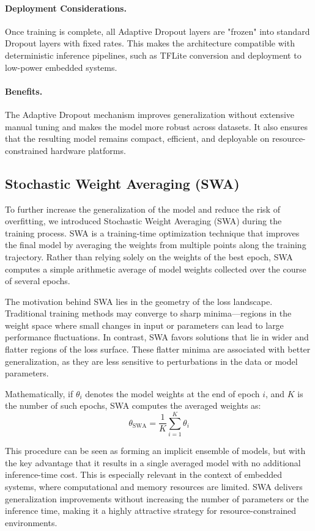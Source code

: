 \paragraph{Deployment Considerations.} Once training is complete, all Adaptive Dropout layers are "frozen" into standard Dropout layers with fixed rates. This makes the architecture compatible with deterministic inference pipelines, such as TFLite conversion and deployment to low-power embedded systems.

\paragraph{Benefits.} The Adaptive Dropout mechanism improves generalization without extensive manual tuning and makes the model more robust across datasets. It also ensures that the resulting model remains compact, efficient, and deployable on resource-constrained hardware platforms.

\subsection{Stochastic Weight Averaging (SWA)}
To further increase the generalization of the model and reduce the risk of overfitting, we introduced Stochastic Weight Averaging (SWA) during the training process. SWA is a training-time optimization technique that improves the final model by averaging the weights from multiple points along the training trajectory. Rather than relying solely on the weights of the best epoch, SWA computes a simple arithmetic average of model weights collected over the course of several epochs.

The motivation behind SWA lies in the geometry of the loss landscape. Traditional training methods may converge to sharp minima—regions in the weight space where small changes in input or parameters can lead to large performance fluctuations. In contrast, SWA favors solutions that lie in wider and flatter regions of the loss surface. These flatter minima are associated with better generalization, as they are less sensitive to perturbations in the data or model parameters.

Mathematically, if $\theta_i$ denotes the model weights at the end of epoch $i$, and $K$ is the number of such epochs, SWA computes the averaged weights as:
\[
\theta_{\text{SWA}} = \frac{1}{K} \sum_{i=1}^{K} \theta_i
\]

This procedure can be seen as forming an implicit ensemble of models, but with the key advantage that it results in a single averaged model with no additional inference-time cost. This is especially relevant in the context of embedded systems, where computational and memory resources are limited. SWA delivers generalization improvements without increasing the number of parameters or the inference time, making it a highly attractive strategy for resource-constrained environments.

